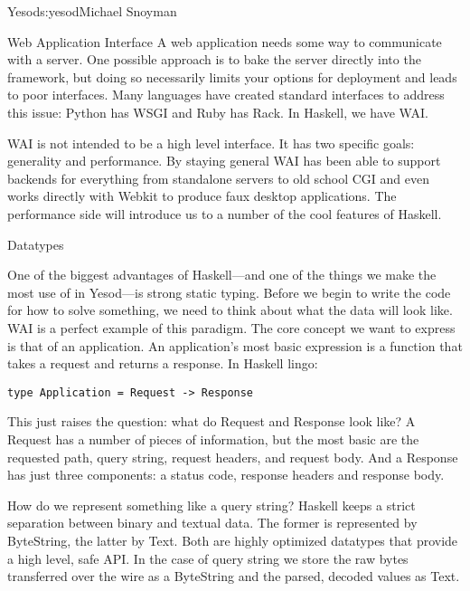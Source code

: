 \begin{aosachapter}{Yesod}{s:yesod}{Michael Snoyman}
\begin{aosasect1}{Web Application Interface}
A web application needs some way to communicate with a server. One
possible approach is to bake the server directly into the framework,
but doing so necessarily limits your options for deployment and leads
to poor interfaces. Many languages have created standard interfaces to
address this issue: Python has WSGI and Ruby has Rack. In Haskell, we
have WAI.

WAI is not intended to be a high level interface. It has two specific
goals: generality and performance. By staying general WAI has been
able to support backends for everything from standalone servers to old
school CGI and even works directly with Webkit to produce faux desktop
applications. The performance side will introduce us to a number of
the cool features of Haskell.


\begin{aosasect2}{Datatypes}

One of the biggest advantages of Haskell---and one of the things we
make the most use of in Yesod---is strong static typing. Before we
begin to write the code for how to solve something, we need to think
about what the data will look like. WAI is a perfect example of this
paradigm. The core concept we want to express is that of an
application. An application's most basic expression is a function that
takes a request and returns a response. In Haskell lingo:

\begin{verbatim}
type Application = Request -> Response
\end{verbatim}

This just raises the question: what do Request and Response look like?
A Request has a number of pieces of information, but the most basic
are the requested path, query string, request headers, and request
body. And a Response has just three components: a status code,
response headers and response body.

How do we represent something like a query string? Haskell keeps a
strict separation between binary and textual data. The former is
represented by ByteString, the latter by Text. Both are highly
optimized datatypes that provide a high level, safe API. In the case
of query string we store the raw bytes transferred over the wire as a
ByteString and the parsed, decoded values as Text.

\end{aosasect2}


\end{aosasect1}
\end{aosachapter}
